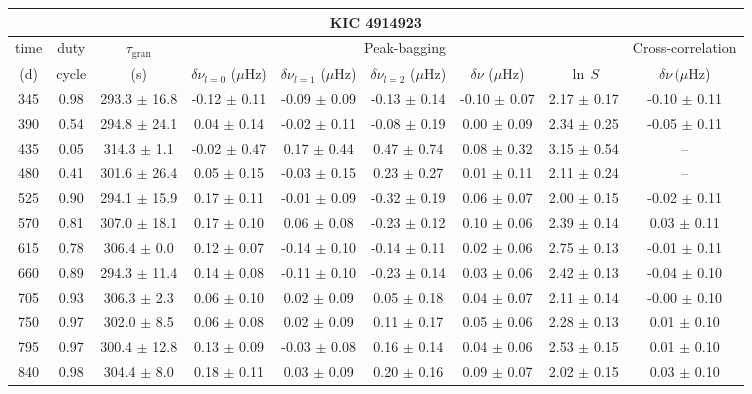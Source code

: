\documentclass[twocolumn]{aastex61}%
\begin{document}
\begin{table*}[ht]\centering\fontsize{9.}{7.}\selectfont
\begin{tabular}{ccc|ccccc|c}
\multicolumn{9}{c}{KIC 4914923}\\ \hline\hline
time & duty & $\tau_\text{gran}$ &\multicolumn{5}{c|}{Peak-bagging}&Cross-correlation\\
(d)& cycle & (s)&$\delta\nu_{l=0}$ ($\mu$Hz) & $\delta\nu_{l=1}$ ($\mu$Hz) & $\delta\nu_{l=2}$ ($\mu$Hz) & $\delta\nu$ ($\mu$Hz)& $\ln\,S$ & $\delta\nu\,(\mu$Hz)\\\hline
345 & 0.98 & 293.3 $\pm$ 16.8 & -0.12 $\pm$ 0.11 & -0.09 $\pm$ 0.09 & -0.13 $\pm$ 0.14 & -0.10 $\pm$ 0.07 & 2.17 $\pm$ 0.17 & -0.10 $\pm$ 0.11\\
390 & 0.54 & 294.8 $\pm$ 24.1 & 0.04 $\pm$ 0.14 & -0.02 $\pm$ 0.11 & -0.08 $\pm$ 0.19 & 0.00 $\pm$ 0.09 & 2.34 $\pm$ 0.25 & -0.05 $\pm$ 0.11\\
435 & 0.05 & 314.3 $\pm$ 1.1 & -0.02 $\pm$ 0.47 & 0.17 $\pm$ 0.44 & 0.47 $\pm$ 0.74 & 0.08 $\pm$ 0.32 & 3.15 $\pm$ 0.54 & --\\
480 & 0.41 & 301.6 $\pm$ 26.4 & 0.05 $\pm$ 0.15 & -0.03 $\pm$ 0.15 & 0.23 $\pm$ 0.27 & 0.01 $\pm$ 0.11 & 2.11 $\pm$ 0.24 & --\\
525 & 0.90 & 294.1 $\pm$ 15.9 & 0.17 $\pm$ 0.11 & -0.01 $\pm$ 0.09 & -0.32 $\pm$ 0.19 & 0.06 $\pm$ 0.07 & 2.00 $\pm$ 0.15 & -0.02 $\pm$ 0.11\\
570 & 0.81 & 307.0 $\pm$ 18.1 & 0.17 $\pm$ 0.10 & 0.06 $\pm$ 0.08 & -0.23 $\pm$ 0.12 & 0.10 $\pm$ 0.06 & 2.39 $\pm$ 0.14 & 0.03 $\pm$ 0.11\\
615 & 0.78 & 306.4 $\pm$ 0.0 & 0.12 $\pm$ 0.07 & -0.14 $\pm$ 0.10 & -0.14 $\pm$ 0.11 & 0.02 $\pm$ 0.06 & 2.75 $\pm$ 0.13 & -0.01 $\pm$ 0.11\\
660 & 0.89 & 294.3 $\pm$ 11.4 & 0.14 $\pm$ 0.08 & -0.11 $\pm$ 0.10 & -0.23 $\pm$ 0.14 & 0.03 $\pm$ 0.06 & 2.42 $\pm$ 0.13 & -0.04 $\pm$ 0.10\\
705 & 0.93 & 306.3 $\pm$ 2.3 & 0.06 $\pm$ 0.10 & 0.02 $\pm$ 0.09 & 0.05 $\pm$ 0.18 & 0.04 $\pm$ 0.07 & 2.11 $\pm$ 0.14 & -0.00 $\pm$ 0.10\\
750 & 0.97 & 302.0 $\pm$ 8.5 & 0.06 $\pm$ 0.08 & 0.02 $\pm$ 0.09 & 0.11 $\pm$ 0.17 & 0.05 $\pm$ 0.06 & 2.28 $\pm$ 0.13 & 0.01 $\pm$ 0.10\\
795 & 0.97 & 300.4 $\pm$ 12.8 & 0.13 $\pm$ 0.09 & -0.03 $\pm$ 0.08 & 0.16 $\pm$ 0.14 & 0.04 $\pm$ 0.06 & 2.53 $\pm$ 0.15 & 0.01 $\pm$ 0.10\\
840 & 0.98 & 304.4 $\pm$ 8.0 & 0.18 $\pm$ 0.11 & 0.03 $\pm$ 0.09 & 0.20 $\pm$ 0.16 & 0.09 $\pm$ 0.07 & 2.02 $\pm$ 0.15 & 0.03 $\pm$ 0.10\\

\end{tabular}
\end{table*}
\end{document}
